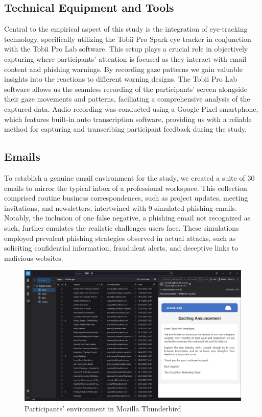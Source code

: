 \documentclass[
  a4paper,  %
  twoside,  %
  bibliography=totoc,
  headsepline,
  cleardoublepage=empty,
  parskip=half,
  draft=false
]{scrbook}
\begin{document}
\subsection{Technical Equipment and Tools}
Central to the empirical aspect of this study is the integration of eye-tracking technology, specifically utilizing the Tobii Pro Spark eye tracker in conjunction with the Tobii Pro Lab software. This setup plays a crucial role in objectively capturing where participants' attention is focused as they interact with email content and phishing warnings. By recording gaze patterns we gain valuable insights into the reactions to different warning designs. The Tobii Pro Lab software allows us the seamless recording of the participants' screen alongside their gaze movements and patterns, faciliating a comprehensive analysis of the captured data. \newline 
Audio recording was conducted using a Google Pixel smartphone, which features built-in auto transcription software, providing us with a reliable method for capturing and transcribing participant feedback during the study.

\subsection{Emails}
To establish a genuine email environment for the study, we created a suite of 30 emails to mirror the typical inbox of a professional workspace. This collection comprised routine business correspondences, such as project updates, meeting invitations, and newsletters, intertwined with 9 simulated phishing emails. Notably, the inclusion of one false negative, a phishing email not recognized as such, further emulates the realistic challenges users face. These simulations employed prevalent phishing strategies observed in actual attacks, such as soliciting confidential information, fraudulent alerts, and deceptive links to malicious websites.

\begin{figure} [ht]
    \centering
    \includegraphics[width=1\linewidth]{figures/example2.png}
    \caption{Participants' environment in Mozilla Thunderbird}
    \label{fig:example2}
\end{figure}
\end{document}
